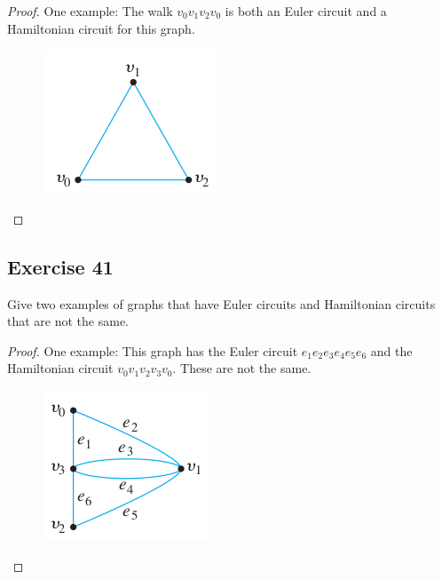 \documentclass[14pt]{extarticle}
\begin{document}
\begin{proof}
    One example: The walk \(v_0v_1v_2v_0\) is both an Euler circuit and a Hamiltonian circuit for this graph.

    \begin{figure}[ht!]
        \centering
        \includegraphics[scale=0.5]{../images/10.1.40.png}
    \end{figure}
\end{proof}

\subsection{Exercise 41}
Give two examples of graphs that have Euler circuits and Hamiltonian circuits that are not the same.

\begin{proof}
    One example: This graph has the Euler circuit \(e_1e_2e_3e_4e_5e_6\) and the Hamiltonian circuit
    \(v_0v_1v_2v_3v_0\). These are not the same.

    \begin{figure}[ht!]
        \centering
        \includegraphics[scale=0.6]{../images/10.1.41.png}
    \end{figure}
\end{proof}
\end{document}
